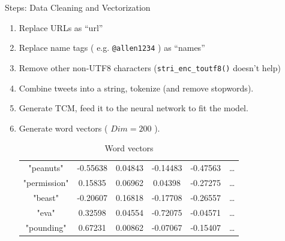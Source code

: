 \documentclass{beamer}
\begin{document}
\begin{frame}{Steps: Data Cleaning and Vectorization}
	\begin{enumerate}
		\item Replace URLs as ``url''
		\item Replace name tags ( e.g. \texttt{@allen1234} ) as ``names''
		\item Remove other non-UTF8 characters (\texttt{stri\_enc\_toutf8()} doesn't help)
		\item Combine tweets into a string, tokenize (and remove stopwords).
		\item Generate TCM, feed it to the neural network to fit the model.
		\item Generate word vectors ( $Dim = 200 $ ).
	\begin{table}[htpb]
		\scriptsize
		\centering
		\caption{Word vectors}
		\label{tab:wordVec}
		\begin{tabular}{c | c c c c c}
			"peanuts" & -0.55638 & 0.04843 & -0.14483 & -0.47563 & \ldots \\
			"permission" & 0.15835 & 0.06962 & 0.04398 & -0.27275 & \ldots \\ 
			"beast" & -0.20607 & 0.16818 & -0.17708 & -0.26557 & \ldots \\
			"eva" & 0.32598 & 0.04554 & -0.72075 & -0.04571 & \ldots \\
			"pounding" & 0.67231 & 0.00862 & -0.07067 & -0.15407 & \ldots \\
		\end{tabular}
	\end{table}
	\end{enumerate}
\end{frame}
\end{document}
